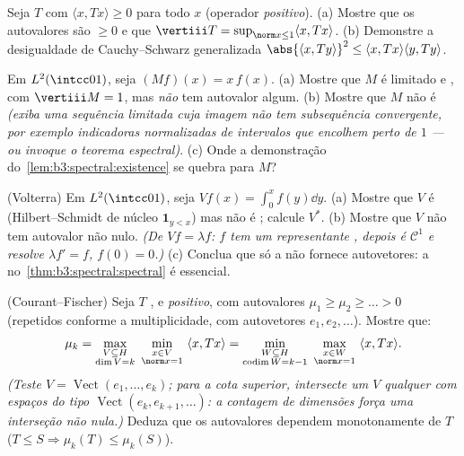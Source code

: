 \begin{exercise}[$\star\star$]\label{exo:b3:spectral:5}
Seja $T$  com $\langle x, Tx\rangle \geq 0$ para todo $x$ (operador
\emph{positivo}).
(a) Mostre que os autovalores são $\geq 0$ e que $\vertiii T =
\sup_{\norm x\leq1}\langle x, Tx\rangle$.
(b) Demonstre a desigualdade de Cauchy--Schwarz generalizada $\abs{\langle x, Ty\rangle}^2 \leq \langle x, Tx\rangle\langle
y, Ty\rangle$.
\end{exercise}

\begin{exercise}[$\star\star$]\label{exo:b3:spectral:6}
Em $L^2(\intcc01)$, seja $(Mf)(x) = x\,f(x)$.
(a) Mostre que $M$ é limitado e , com $\vertiii M =
1$, mas
\emph{não} tem autovalor algum.
(b) Mostre que $M$ não é  \emph{(exiba uma sequência
limitada cuja imagem não tem subsequência convergente, por exemplo
indicadoras normalizadas de intervalos que encolhem perto de $1$ ---
ou invoque o teorema espectral)}.
(c) Onde a demonstração do~\cref{lem:b3:spectral:existence} se quebra para $M$?
\end{exercise}

\begin{exercise}[$\star\star$]\label{exo:b3:spectral:7}
(Volterra) Em $L^2(\intcc01)$, seja $Vf(x) = \int_0^xf(y)\dd
y$.
(a) Mostre que $V$ é  (Hilbert--Schmidt de núcleo $\mathbf
1_{y < x}$) mas
não é ; calcule $V^*$.
(b) Mostre que $V$ não tem autovalor não nulo. \emph{(De $Vf =
\lambda f$:
$f$ tem um representante , depois é $\mathcal C^1$ e resolve $\lambda f' = f$,
$f(0) = 0$.)}
(c) Conclua que só a  não fornece autovetores: a 
no~\cref{thm:b3:spectral:spectral} é essencial.
\end{exercise}

\begin{exercise}[$\star\star\star$]\label{exo:b3:spectral:8}
(Courant--Fischer) Seja $T$ ,  e \emph{positivo},
com autovalores $\mu_1 \geq \mu_2 \geq \dots
> 0$ (repetidos conforme a multiplicidade, com
autovetores $e_1, e_2,
\dots$). Mostre que:
\[
\mu_{k} = \max_{\substack{V \subseteq H \\ \dim V = k}}\
\min_{\substack{x \in V\\ \norm x = 1}}\ \langle x, Tx\rangle
= \min_{\substack{W \subseteq H\\ \operatorname{codim}W =
k-1}}\ \max_{\substack{x\in W\\ \norm x = 1}}\ \langle x,
Tx\rangle .
\]
\emph{(Teste $V = \operatorname{Vect}(e_1,\dots,e_k)$; para a cota superior, intersecte um $V$ qualquer
com espaços do tipo $\operatorname{Vect}(e_k, e_{k+1}, \dots)$: a contagem de dimensões força uma interseção
não nula.)} Deduza que os autovalores dependem monotonamente de $T$
($T \leq S
\Rightarrow \mu_k(T) \leq \mu_k(S)$).
\end{exercise}

